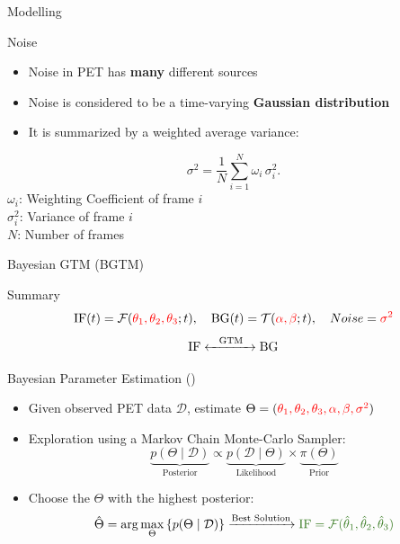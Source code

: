 \documentclass[aspectratio=169]{beamer}
\newcommand{\citeauthoryear}[1]{\citeauthor{#1} (\citeyear{#1})}
\begin{document}
\begin{frame}{Modelling}
	\begin{block}{Noise}
		\begin{itemize}
			\setlength\itemsep{1.5em}
			\item Noise in PET has \textbf{many} different sources
			\item Noise is considered to be a time-varying \textbf{Gaussian distribution}
			\item It is summarized by a weighted average variance:
		\end{itemize}
		\[
			\sigma^2 = \frac{1}{N} \sum_{i=1}^{N} \omega_i\,\sigma_i^2.
		\]
		\(\omega_i\): Weighting Coefficient of frame $i$\\[1.5em]
		\(\sigma_i^2\): Variance of frame $i$\\[1.5em]
		$N$: Number of frames
	\end{block}
\end{frame}



\begin{frame}[t]{Bayesian GTM (BGTM)}
	\begin{block}{Summary}
		\[
			\text{IF}(t) = \mathcal{F}(\textcolor{red}{\theta_1,\theta_2,\theta_3};t),
			\quad \text{BG}(t)=\mathcal{T}(\textcolor{red}{\alpha,\beta};t),
			\quad Noise=\textcolor{red}{\sigma^2}
		\]
		\[
			\text{IF} \xleftrightarrow{\text{\quad GTM\quad}} \text{BG}
		\]
	\end{block}
	\pause
	\begin{block}{Bayesian Parameter Estimation \citeauthoryear{irace2020bayesian}}
		\small
		\begin{itemize}
			\item<2-> Given observed PET data $\mathcal{D}$, estimate $\Theta=(\textcolor{red}{\theta_1, \theta_2, \theta_3, \alpha, \beta,\sigma^2})$
			\item<3-> Exploration using a Markov Chain Monte-Carlo Sampler:
			      \[
				      \underbrace{p(\Theta \mid \mathcal{D})}_{\text{Posterior}} \propto \underbrace{p(\mathcal{D} \mid \Theta)}_{\text{Likelihood}} \times \underbrace{\pi(\Theta)}_{\text{Prior}}
			      \]
			\item<4-> Choose the $\Theta$ with the highest posterior:
			      \[
				      \hat{\Theta} = \arg\max_{\Theta} \left\{ p(\Theta \mid \mathcal{D}) \right\}
				      \xrightarrow{\text{Best Solution}}
				      \textcolor{OliveGreen}{\text{IF} = \mathcal{F}(\hat{\theta}_1, \hat{\theta}_2, \hat{\theta}_3)}
			      \]
		\end{itemize}
	\end{block}
\end{frame}
\end{document}
